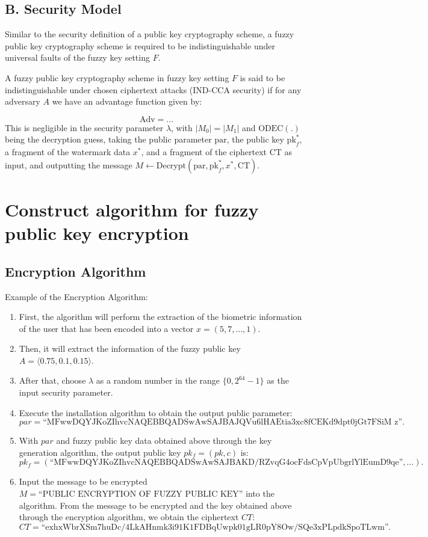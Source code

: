 \documentclass[graybox]{svmult}
\begin{document}
\subsection*{B. Security Model}

Similar to the security definition of a public key cryptography scheme, a fuzzy public key cryptography scheme is required to be indistinguishable under universal faults of the fuzzy key setting $F$.

A fuzzy public key cryptography scheme in fuzzy key setting $F$ is said to be indistinguishable under chosen ciphertext attacks (IND-CCA security) if for any adversary $A$ we have an advantage function given by:

\[
    \text{Adv} = \dots
\]
This is negligible in the security parameter $\lambda$, with $|M_0| = |M_1|$ and $\text{ODEC}(.)$ being the decryption guess, taking the public parameter $\text{par}$, the public key $\text{pk}_f^*$, a fragment of the watermark data $x^*$, and a fragment of the ciphertext $\text{CT}$ as input, and outputting the message $M \leftarrow \text{Decrypt}(\text{par}, \text{pk}_f^*, x^*, \text{CT})$.

\section{Construct algorithm for fuzzy public key encryption}
\subsection{Encryption Algorithm}

Example of the Encryption Algorithm:
\begin{enumerate}
    \item First, the algorithm will perform the extraction of the biometric information of the user that has been encoded into a vector $x = (5, 7, \dots, 1)$.
    \item Then, it will extract the information of the fuzzy public key $A = \langle 0.75, 0.1, 0.15 \rangle$.
    \item After that, choose $\lambda$ as a random number in the range $\{0, 2^{64} - 1\}$ as the input security parameter.
    \item Execute the installation algorithm to obtain the output public parameter:
          \[
              par = \text{``MFwwDQYJKoZIhvcNAQEBBQADSwAwSAJBAJQVu6lHAEtia3xc8fCEKd9dpt0jGt7FSiM\ z''}.
          \]
    \item With $par$ and fuzzy public key data obtained above through the key generation algorithm, the output public key $pk_f = (pk, c)$ is:
          \[
              pk_f = (\text{``MFwwDQYJKoZIhvcNAQEBBQADSwAwSAJBAKD/RZvqG4ocFdsCpVpUbgrlYlEumD9qe''}, \dots).
          \]
    \item Input the message to be encrypted $M = \text{``PUBLIC ENCRYPTION OF FUZZY PUBLIC KEY''}$ into the algorithm. From the message to be encrypted and the key obtained above through the encryption algorithm, we obtain the ciphertext $CT$:
          \[
              CT = \text{``exhxWbrXSm7huDc/4LkAHnmk3i91K1FDBqUwpk01gLR0pY8Ow/SQe3xPLpdkSpoTLwm''}.
          \]
\end{enumerate}
\end{document}
